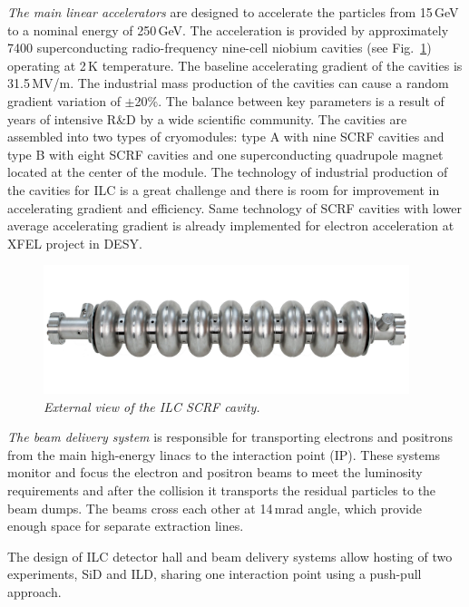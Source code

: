 \textit{The main linear accelerators} are designed to accelerate the particles from 15\,GeV to a nominal energy of 250\,GeV. 
The acceleration is provided by approximately 7400 superconducting radio-frequency nine-cell niobium cavities (see Fig.~\ref{fig:ILCcavity}) operating at 2\,K temperature. 
The baseline accelerating gradient of the cavities is 31.5\,MV/m. 
The industrial mass production of the cavities can cause a random gradient variation of $\pm$20\%. 
The balance between key parameters is a result of years of intensive R\&D by a wide scientific community. 
The cavities are assembled into two types of cryomodules: type A with nine SCRF cavities and type B with eight SCRF cavities and one superconducting quadrupole magnet located at the center of the module. 
The technology of industrial production of the cavities for ILC is a great challenge and there is room for improvement in accelerating gradient and efficiency. 
Same technology of SCRF cavities with lower average accelerating gradient is already implemented for electron acceleration at XFEL project in DESY. 
\begin{figure}
{\centering
    \includegraphics[width=0.95\textwidth]{graphics/Cavity.jpg}
    \caption{\sl External view of the ILC SCRF cavity.}
    \label{fig:ILCcavity}
  }
\end{figure}

\textit{The beam delivery system} is responsible for transporting electrons and positrons from the main high-energy linacs to the interaction point (IP). These systems monitor and focus the electron and positron beams to meet the luminosity requirements and after the collision it transports the residual particles to the beam dumps. 
The beams cross each other at 14\,mrad angle, which provide enough space for separate extraction lines. 

The design of ILC detector hall and beam delivery systems allow hosting of two experiments, SiD and ILD, sharing one interaction point using a push-pull approach. 

